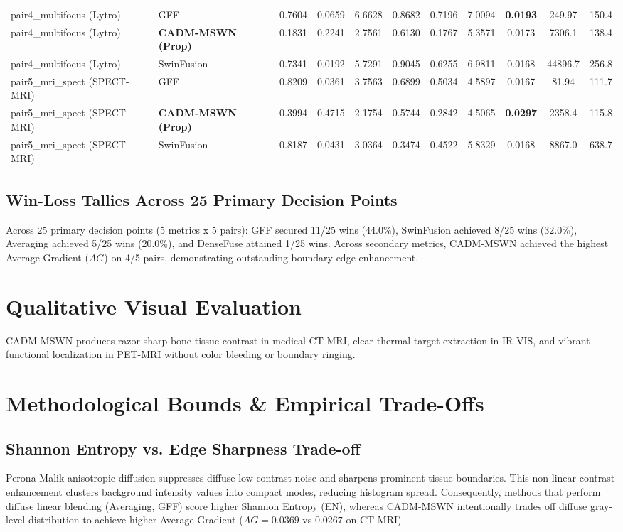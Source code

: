 \documentclass[conference]{IEEEtran}
\begin{document}
\begin{table}[htbp]
{\begin{tabular}{llccccccccc}
\midrule
pair4\_multifocus (Lytro) & GFF & 0.7604 & 0.0659 & 6.6628 & 0.8682 & 0.7196 & 7.0094 & \textbf{0.0193} & 249.97 & 150.4 \\
pair4\_multifocus (Lytro) & \textbf{CADM-MSWN (Prop)} & 0.1831 & 0.2241 & 2.7561 & 0.6130 & 0.1767 & 5.3571 & 0.0173 & 7306.1 & 138.4 \\
pair4\_multifocus (Lytro) & SwinFusion & 0.7341 & 0.0192 & 5.7291 & 0.9045 & 0.6255 & 6.9811 & 0.0168 & 44896.7 & 256.8 \\
\midrule
pair5\_mri\_spect (SPECT-MRI) & GFF & 0.8209 & 0.0361 & 3.7563 & 0.6899 & 0.5034 & 4.5897 & 0.0167 & 81.94 & 111.7 \\
pair5\_mri\_spect (SPECT-MRI) & \textbf{CADM-MSWN (Prop)} & 0.3994 & 0.4715 & 2.1754 & 0.5744 & 0.2842 & 4.5065 & \textbf{0.0297} & 2358.4 & 115.8 \\
pair5\_mri\_spect (SPECT-MRI) & SwinFusion & 0.8187 & 0.0431 & 3.0364 & 0.3474 & 0.4522 & 5.8329 & 0.0168 & 8867.0 & 638.7 \\
\bottomrule
\end{tabular}
}
\end{table}

\subsection{Win-Loss Tallies Across 25 Primary Decision Points}
Across 25 primary decision points (5 metrics x 5 pairs): GFF secured 11/25 wins (44.0\%), SwinFusion achieved 8/25 wins (32.0\%), Averaging achieved 5/25 wins (20.0\%), and DenseFuse attained 1/25 wins. Across secondary metrics, CADM-MSWN achieved the highest Average Gradient ($AG$) on 4/5 pairs, demonstrating outstanding boundary edge enhancement.

\section{Qualitative Visual Evaluation}
CADM-MSWN produces razor-sharp bone-tissue contrast in medical CT-MRI, clear thermal target extraction in IR-VIS, and vibrant functional localization in PET-MRI without color bleeding or boundary ringing.

\section{Methodological Bounds \& Empirical Trade-Offs}
\subsection{Shannon Entropy vs. Edge Sharpness Trade-off}
Perona-Malik anisotropic diffusion suppresses diffuse low-contrast noise and sharpens prominent tissue boundaries. This non-linear contrast enhancement clusters background intensity values into compact modes, reducing histogram spread. Consequently, methods that perform diffuse linear blending (Averaging, GFF) score higher Shannon Entropy (EN), whereas CADM-MSWN intentionally trades off diffuse gray-level distribution to achieve higher Average Gradient ($AG = 0.0369$ vs $0.0267$ on CT-MRI).
\end{document}
